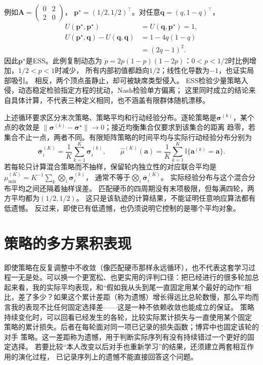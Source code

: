 例如\(\bm A=\left(\begin{smallmatrix}0&2\\2&0\end{smallmatrix}\right)\)，
\(\bm p^\star=(1/2,1/2)^\top\)。对任意\(\bm q=(q,1-q)^\top\)，
\[
  \begin{aligned}
    U(\bm p^\star,\bm p^\star)&=U(\bm q,\bm p^\star)=1,\\
    U(\bm p^\star,\bm q)-U(\bm q,\bm q)&=1-4q(1-q)\\
      &=(2q-1)^2.
  \end{aligned}
\]
因此\(\bm p^\star\)是ESS。此例复制动态为
\(\dot p=2p(1-p)(1-2p)\)：\(0<p<1/2\)时比例增加，\(1/2<p<1\)时减少，
所有内部初值都趋向\(1/2\)；线性化导数为\(-1\)，也证实局部吸引。
相反，两个顶点虽静止，却可被缺席类型侵入。
ESS检验少量策略入侵，动态稳定检验指定方程的扰动，Nash检验单方偏离；
这里同时成立的结论来自具体计算，不代表三种定义相同，也不涵盖有限群体随机漂移。

上述循环要求区分末次策略、策略平均和行动经验分布。逐轮策略是\(\bm\sigma^{(k)}\)，某个点的收敛是
\(\|\bm\sigma^{(k)}-\bm\sigma^\star\|\to0\)；接近均衡集合仅要求到该集合的距离
趋零，若集合不止一点，两者不同。有限矩阵策略的时间平均与实际行动经验分布分别为
\[
  \bar{\bm\sigma}_i^{(K)}
  =\frac1K\sum_{k=1}^K\bm\sigma_i^{(k)},\qquad
  \widehat\mu^{(K)}(\bm a)
  =\frac1K\sum_{k=1}^K\mathbb I\{\bm a^{(k)}=\bm a\}.
\]
若每轮只计算混合策略而不抽样，保留轮内独立性的对应联合平均是
\(\mu_{\mathrm{mix}}^{(K)}=K^{-1}\sum_k\bigotimes_i\bm\sigma_i^{(k)}\)，
通常不等于\(\bigotimes_i\bar{\bm\sigma}_i^{(K)}\)。
实际经验分布与这个混合分布平均之间还隔着抽样误差。
匹配硬币的四周期没有末项极限，但每满四轮，两方平均都为\((1/2,1/2)\)。
这只是该轨迹的计算结果，不能证明任意响应算法都有低遗憾。
反过来，即使已有低遗憾，也仍须说明它控制的是哪个平均对象。

\section{策略的多方累积表现}
\label{sec:game-regret-cfr}

即使策略在反复调整中不收敛（像匹配硬币那样永远循环），也不代表这套学习过程一无是处。可以换一个更宽松、也更实用的评判口径：把已经进行的很多轮加总起来看，我的实际平均表现，和“假如我从头到尾一直固定用某个最好的动作”相比，差了多少？如果这个累计差距（称为遗憾）增长得远比总轮数慢，那么平均而言我的表现不比任何固定选择差——这是一种不依赖收敛也能成立的保证。
策略持续变化时，可以回看已经发生的各轮，比较实际累计损失与一直使用某个固定
策略的累计损失。后者在每轮面对同一项已记录的损失函数；博弈中也固定该轮的对手
策略。这一差距称为遗憾，用于判断实际序列有没有持续错过一个更好的固定选择。
若要比较“本人改变以后对手也重新学习”的结果，还须建立两套相互作用的演化过程，
已记录序列上的遗憾不能直接回答这个问题。

